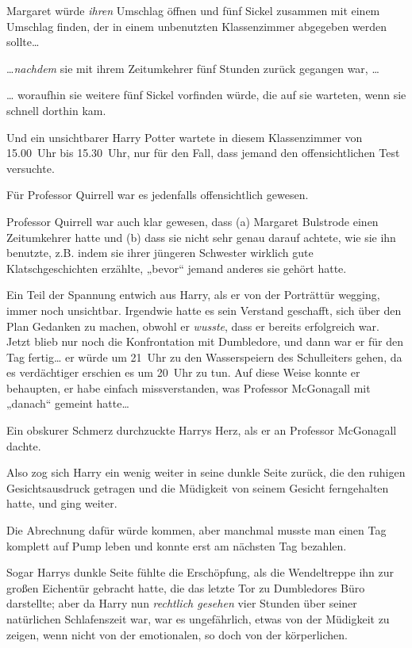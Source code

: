 {Margaret würde \emph{ihren} Umschlag öffnen und fünf Sickel zusammen mit einem Umschlag finden, der in einem unbenutzten Klassenzimmer abgegeben werden sollte…

…\emph{nachdem} sie mit ihrem Zeitumkehrer fünf Stunden zurück gegangen war, …

… woraufhin sie weitere fünf Sickel vorfinden würde, die auf sie warteten, wenn sie schnell dorthin kam.

Und ein unsichtbarer Harry Potter wartete in diesem Klassenzimmer von 15.00~Uhr bis 15.30~Uhr, nur für den Fall, dass jemand den offensichtlichen Test versuchte.

Für Professor Quirrell war es jedenfalls offensichtlich gewesen.

Professor Quirrell war auch klar gewesen, dass (a) Margaret Bulstrode einen Zeitumkehrer hatte und (b) dass sie nicht sehr genau darauf achtete, wie sie ihn benutzte, z.B. indem sie ihrer jüngeren Schwester wirklich gute Klatschgeschichten erzählte, „bevor“ jemand anderes sie gehört hatte.

Ein Teil der Spannung entwich aus Harry, als er von der Porträttür wegging, immer noch unsichtbar. Irgendwie hatte es sein Verstand geschafft, sich über den Plan Gedanken zu machen, obwohl er \emph{wusste}, dass er bereits erfolgreich war. Jetzt blieb nur noch die Konfrontation mit Dumbledore, und dann war er für den Tag fertig… er würde um 21~Uhr zu den Wasserspeiern des Schulleiters gehen, da es verdächtiger erschien es um 20~Uhr zu tun. Auf diese Weise konnte er behaupten, er habe einfach missverstanden, was Professor McGonagall mit „danach“ gemeint hatte…

Ein obskurer Schmerz durchzuckte Harrys Herz, als er an Professor McGonagall dachte.

Also zog sich Harry ein wenig weiter in seine dunkle Seite zurück, die den ruhigen Gesichtsausdruck getragen und die Müdigkeit von seinem Gesicht ferngehalten hatte, und ging weiter.

Die Abrechnung dafür würde kommen, aber manchmal musste man einen Tag komplett auf Pump leben und konnte erst am nächsten Tag bezahlen.

Sogar Harrys dunkle Seite fühlte die Erschöpfung, als die Wendeltreppe ihn zur großen Eichentür gebracht hatte, die das letzte Tor zu Dumbledores Büro darstellte; aber da Harry nun \emph{rechtlich gesehen} vier Stunden über seiner natürlichen Schlafenszeit war, war es ungefährlich, etwas von der Müdigkeit zu zeigen, wenn nicht von der emotionalen, so doch von der körperlichen.

}
